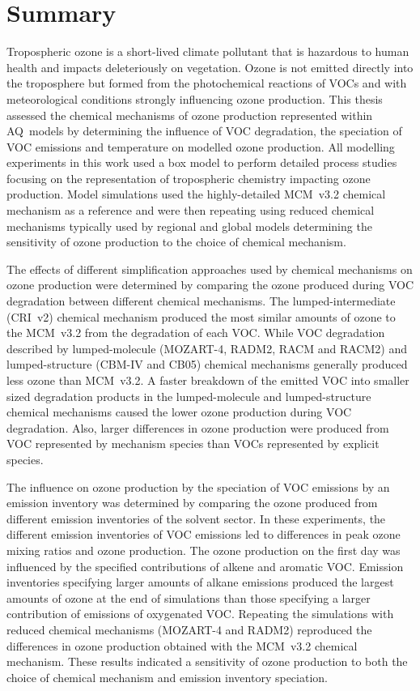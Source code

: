 \section{Summary}
Tropospheric ozone is a short-lived climate pollutant that is hazardous to human health and impacts deleteriously on vegetation.
Ozone is not emitted directly into the troposphere but formed from the photochemical reactions of VOCs and  with meteorological conditions strongly influencing ozone production.
This thesis assessed the chemical mechanisms of ozone production represented within AQ~models by determining the influence of VOC degradation, the speciation of VOC emissions and temperature on modelled ozone production.
All modelling experiments in this work used a box model to perform detailed process studies focusing on the representation of tropospheric chemistry impacting ozone production.
Model simulations used the highly-detailed MCM~v3.2 chemical mechanism as a reference and were then repeating using reduced chemical mechanisms typically used by regional and global models determining the sensitivity of ozone production to the choice of chemical mechanism.

The effects of different simplification approaches used by chemical mechanisms on ozone production were determined by comparing the ozone produced during VOC degradation between different chemical mechanisms.
The lumped-intermediate (CRI~v2) chemical mechanism produced the most similar amounts of ozone to the MCM~v3.2 from the degradation of each VOC.
While VOC degradation described by lumped-molecule (MOZART-4, RADM2, RACM and RACM2) and lumped-structure (CBM-IV and CB05) chemical mechanisms generally produced less ozone than MCM~v3.2.
A faster breakdown of the emitted VOC into smaller sized degradation products in the lumped-molecule and lumped-structure chemical mechanisms caused the lower ozone production during VOC degradation.
Also, larger differences in ozone production were produced from VOC represented by mechanism species than VOCs represented by explicit species.

The influence on ozone production by the speciation of VOC emissions by an emission inventory was determined by comparing the ozone produced from different emission inventories of the solvent sector.
In these experiments, the different emission inventories of VOC emissions led to differences in peak ozone mixing ratios and ozone production.
The ozone production on the first day was influenced by the specified contributions of alkene and aromatic VOC.
Emission inventories specifying larger amounts of alkane emissions produced the largest amounts of ozone at the end of simulations than those specifying a larger contribution of emissions of oxygenated VOC.
Repeating the simulations with reduced chemical mechanisms (MOZART-4 and RADM2) reproduced the differences in ozone production obtained with the MCM~v3.2 chemical mechanism.
These results indicated a sensitivity of ozone production to both the choice of chemical mechanism and emission inventory speciation.

